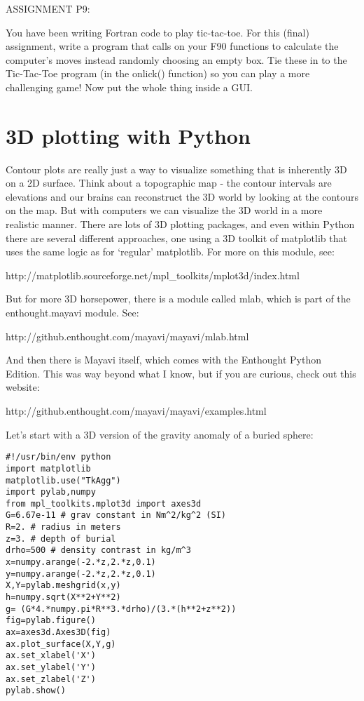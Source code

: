 {\color{red}\singlespacing

ASSIGNMENT P9:

You have been writing Fortran code to play tic-tac-toe.  For this (final) assignment,  write a program that calls on your F90 functions to calculate the computer's moves instead  randomly choosing an empty box.   Tie these in to the Tic-Tac-Toe program (in the {\color{blue}onlick()} function) so you can play a more challenging game!   Now put the whole thing inside a GUI.  
}

\section{3D plotting with Python}

Contour plots are really just a way to visualize something that is inherently 3D on a 2D surface.  Think about a topographic map - the contour intervals are elevations and our brains can reconstruct the 3D world by looking at the contours on the map.  But with computers we can visualize the 3D world in a more realistic manner.  There are lots of 3D plotting packages, and even within Python there are several different approaches, one using a 3D toolkit of {\color{blue}matplotlib} that uses the same logic as for `regular'  {\color{blue}matplotlib}. For more on this module, see:

http://matplotlib.sourceforge.net/mpl\_toolkits/mplot3d/index.html

\noindent
 But for more 3D horsepower, there is a module called {\color{blue}mlab}, which is part of the enthought.mayavi module.  See: 
 
 
 http://github.enthought.com/mayavi/mayavi/mlab.html

\noindent
 And then there is {\color{blue}Mayavi} itself, which comes with the Enthought Python Edition.   This was way beyond what I know, but if you are curious, check out this website:
 
 http://github.enthought.com/mayavi/mayavi/examples.html
 

Let's start with a 3D version of the gravity anomaly of a buried sphere:   

{\singlespacing \color{blue} \begin{verbatim}
#!/usr/bin/env python
import matplotlib
matplotlib.use("TkAgg")
import pylab,numpy
from mpl_toolkits.mplot3d import axes3d
G=6.67e-11 # grav constant in Nm^2/kg^2 (SI)
R=2. # radius in meters
z=3. # depth of burial
drho=500 # density contrast in kg/m^3
x=numpy.arange(-2.*z,2.*z,0.1)
y=numpy.arange(-2.*z,2.*z,0.1)
X,Y=pylab.meshgrid(x,y)
h=numpy.sqrt(X**2+Y**2)
g= (G*4.*numpy.pi*R**3.*drho)/(3.*(h**2+z**2))
fig=pylab.figure()
ax=axes3d.Axes3D(fig)
ax.plot_surface(X,Y,g)
ax.set_xlabel('X')
ax.set_ylabel('Y')
ax.set_zlabel('Z')
pylab.show()
\end{verbatim}}

